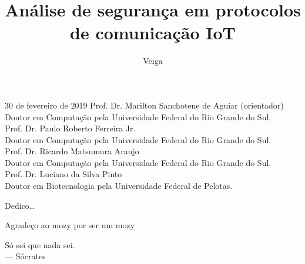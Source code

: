 \documentclass[tcc,capa]{texufpel}
\title{Análise de segurança em protocolos de comunicação IoT}
\author{Veiga}{Eduardo Santos da}
\begin{document}

\maketitle 

\sloppy

\fichacatalografica


\begin{aprovacao}{30 de fevereiro de 2019} %
\noindent Prof. Dr. Marilton Sanchotene de Aguiar (orientador)\\
Doutor em Computação pela Universidade Federal do Rio Grande do Sul.\\[1cm]

\noindent Prof. Dr. Paulo Roberto Ferreira Jr.\\
Doutor em Computação pela Universidade Federal do Rio Grande do Sul.\\[1cm]

\noindent Prof. Dr. Ricardo Matsumura Araujo\\
Doutor em Computação pela Universidade Federal do Rio Grande do Sul.\\[1cm]

\noindent Prof. Dr. Luciano da Silva Pinto\\
Doutor em Biotecnologia pela Universidade Federal de Pelotas.
\end{aprovacao}

\begin{dedicatoria}
  Dedico\ldots 
\end{dedicatoria}

\begin{agradecimentos}
  Agradeço ao mozy por ser um mozy
\end{agradecimentos}

\begin{epigrafe}
  Só sei que nada sei.\\
  {\sc --- Sócrates}
\end{epigrafe}
\end{document}
